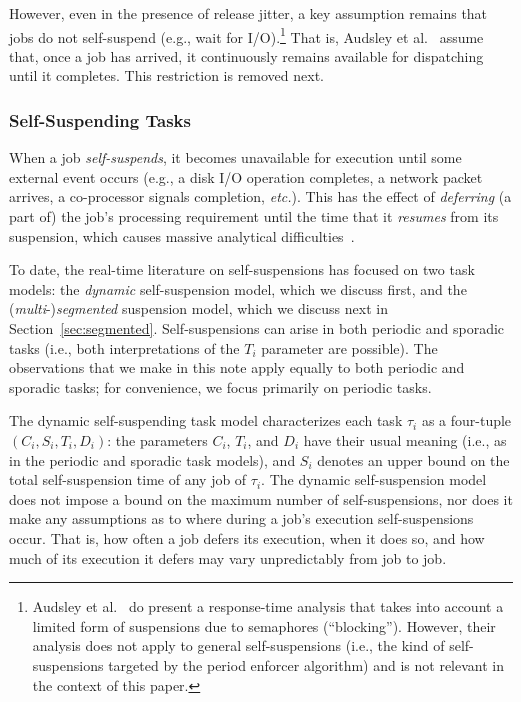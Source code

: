 However, even in the presence of release jitter, a key assumption remains that jobs do not self-suspend (e.g., wait for I/O).\footnote{Audsley et al.~\cite{ABRTW:93} do present a response-time analysis that takes into account a limited form of suspensions due to semaphores (``blocking''). However, their analysis does not apply to general self-suspensions (i.e., the kind of self-suspensions targeted by the period enforcer algorithm)  and is not relevant in the context of this paper.} That is, Audsley et al.~\cite{ABRTW:93} assume that, once a job has arrived, it continuously remains available for dispatching until it completes. This restriction is removed next.


\subsubsection{Self-Suspending Tasks}
\label{sec:dynamic}

When a job \emph{self-suspends}, it becomes unavailable for execution until some external event occurs (e.g., a disk I/O operation completes, a network packet arrives, a co-processor signals completion, \textit{etc.}). This has the effect of \emph{deferring} (a part of) the job's processing requirement until the time that it \emph{resumes} from its suspension, which causes massive analytical difficulties~\cite{LSS:87,LSST:91,Ra:90,ABRTW:93,SLS:95,WC16-suspend-DATE,ecrts15nelissen,Ri:04,Raj:suspension1991,Chen2016}. 

To date, the real-time literature on self-suspensions has focused on two task models: the \emph{dynamic} self-suspension model, which we discuss first,  and the  (\emph{multi}-)\emph{segmented} suspension model, which we discuss next in Section~\ref{sec:segmented}.  Self-suspensions can arise in both periodic and sporadic tasks (i.e., both interpretations of the $T_i$ parameter are possible). The observations that we make in this note apply equally to both periodic and sporadic tasks; for convenience, we focus primarily on periodic tasks.

The dynamic self-suspending task model characterizes each
task $\tau_i$ as a four-tuple $(C_i,S_i,T_i,D_i)$: the parameters $C_i$, $T_i$, and $D_i$ have their usual meaning (i.e., as in the periodic and sporadic task models), and $S_i$ denotes an upper bound on the total self-suspension time of any job of $\tau_i$. The dynamic self-suspension model does not impose a bound on the maximum number of self-suspensions, nor does it make any assumptions as to where during a job's execution self-suspensions occur. That is, how often a job defers its execution, when it does so, and how much of its execution it defers may vary unpredictably from job to job.

